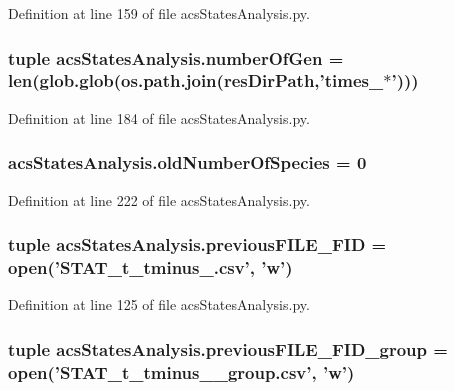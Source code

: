 Definition at line 159 of file acs\-States\-Analysis.\-py.

\hypertarget{a00098_a54acb4eba0735e72c2a820383febd37f}{
\subsubsection[{number\-Of\-Gen}]{\setlength{\rightskip}{0pt plus 5cm}tuple acs\-States\-Analysis.\-number\-Of\-Gen = len(glob.\-glob(os.\-path.\-join({\bf res\-Dir\-Path},'times\-\_\-$\ast$')))}}\label{a00098_a54acb4eba0735e72c2a820383febd37f}


Definition at line 184 of file acs\-States\-Analysis.\-py.

\hypertarget{a00098_abe1ce9bb85ee916d2046efc5c3fe6b30}{
\subsubsection[{old\-Number\-Of\-Species}]{\setlength{\rightskip}{0pt plus 5cm}acs\-States\-Analysis.\-old\-Number\-Of\-Species = 0}}\label{a00098_abe1ce9bb85ee916d2046efc5c3fe6b30}


Definition at line 222 of file acs\-States\-Analysis.\-py.

\hypertarget{a00098_aba65725a1bd6d1b891b02dc7f3db2335}{
\subsubsection[{previous\-F\-I\-L\-E\-\_\-\-F\-I\-D}]{\setlength{\rightskip}{0pt plus 5cm}tuple acs\-States\-Analysis.\-previous\-F\-I\-L\-E\-\_\-\-F\-I\-D = open('S\-T\-A\-T\-\_\-t\-\_\-tminus\-\_.\-csv', 'w')}}\label{a00098_aba65725a1bd6d1b891b02dc7f3db2335}


Definition at line 125 of file acs\-States\-Analysis.\-py.

\hypertarget{a00098_a9e72c152be1f5aac24af10b353b16390}{
\subsubsection[{previous\-F\-I\-L\-E\-\_\-\-F\-I\-D\-\_\-group}]{\setlength{\rightskip}{0pt plus 5cm}tuple acs\-States\-Analysis.\-previous\-F\-I\-L\-E\-\_\-\-F\-I\-D\-\_\-group = open('S\-T\-A\-T\-\_\-t\-\_\-tminus\-\_\-\_\-group.\-csv', 'w')}}\label{a00098_a9e72c152be1f5aac24af10b353b16390}


